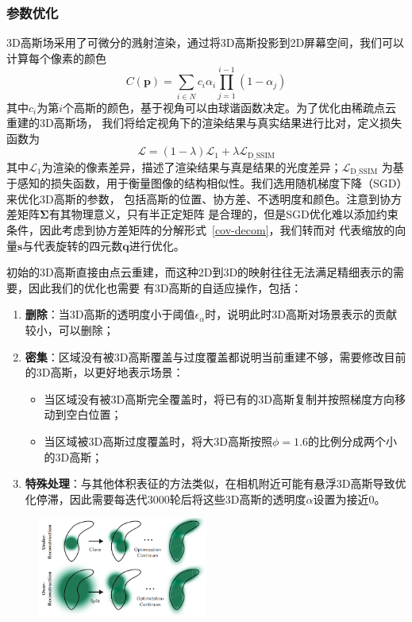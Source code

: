 \subsubsection{参数优化}
3D高斯场采用了可微分的溅射渲染，通过将3D高斯投影到2D屏幕空间，我们可以计算每个像素的颜色
\begin{equation}
    C(\symbf{p})=\sum_{i\in N}c_i\alpha_i\prod_{j=1}^{i-1}(1-\alpha_j)
\end{equation}
其中$c_i$为第$i$个高斯的颜色，基于视角可以由球谐函数决定。为了优化由稀疏点云重建的3D高斯场，
我们将给定视角下的渲染结果与真实结果进行比对，定义损失函数为
\begin{equation}
    \mathcal{L}=(1-\lambda)\mathcal{L}_1+\lambda\mathcal{L}_\text{D\_SSIM}
\end{equation}
其中$\mathcal{L}_1$为渲染的像素差异，描述了渲染结果与真是结果的光度差异；$\mathcal{L}_\text{D\_SSIM}$
为基于感知的损失函数，用于衡量图像的结构相似性。我们选用随机梯度下降（SGD）来优化3D高斯的参数，
包括高斯的位置、协方差、不透明度和颜色。注意到协方差矩阵$\symbf{\Sigma}$有其物理意义，只有半正定矩阵
是合理的，但是SGD优化难以添加约束条件，因此考虑到协方差矩阵的分解形式~\eqref{cov-decom}，我们转而对
代表缩放的向量$\symbf{s}$与代表旋转的四元数$\symbf{q}$进行优化。

初始的3D高斯直接由点云重建，而这种2D到3D的映射往往无法满足精细表示的需要，因此我们的优化也需要
有3D高斯的自适应操作，包括：
\begin{enumerate}
    \item \textbf{删除}：当3D高斯的透明度小于阈值$\epsilon_{\alpha}$时，说明此时3D高斯对场景表示的贡献较小，可以删除；
    \item \textbf{密集}：区域没有被3D高斯覆盖与过度覆盖都说明当前重建不够，需要修改目前的3D高斯，以更好地表示场景：
        \begin{itemize}
            \item 当区域没有被3D高斯完全覆盖时，将已有的3D高斯复制并按照梯度方向移动到空白位置；
            \item 当区域被3D高斯过度覆盖时，将大3D高斯按照$\phi=1.6$的比例分成两个小的3D高斯；
        \end{itemize}
    \item \textbf{特殊处理}：与其他体积表征的方法类似，在相机附近可能有悬浮3D高斯导致优化停滞，因此需要每迭代3000轮后将这些3D高斯的透明度$\alpha$设置为接近0。
\end{enumerate}

\begin{figure}[ht]
    \centering
    \includegraphics[width=0.5\textwidth]{source/img/gauss_recon.png}
\end{figure}

